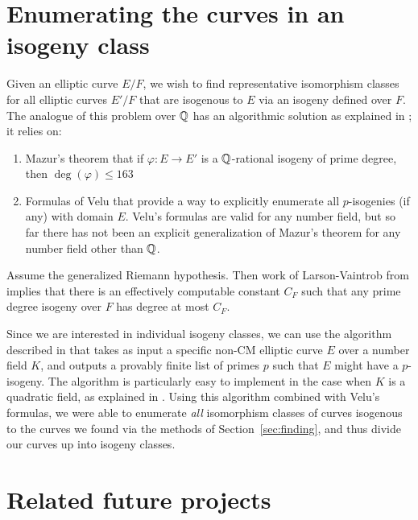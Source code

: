 \documentclass{amsart}
\begin{document}
\section{Enumerating the curves in an isogeny class}\label{sec:isoclass}

Given an elliptic curve $E/F$, we wish to find representative
isomorphism classes for all elliptic curves $E'/F$ that are isogenous
to $E$ via an isogeny defined over $F$. The analogue of this problem
over $\mathbb{Q}$ has an algorithmic solution as explained in
\cite[\S3.8]{cremona:algs}; it relies on:
\begin{enumerate}
\item  Mazur's theorem \cite{mazur:rational} 
that if $\varphi:E\to E'$ is a $\mathbb{Q}$-rational isogeny of prime degree, 
then $\deg(\varphi)\leq 163$
\item Formulas of Velu \cite{velu:isogenies} 
that provide a way to explicitly enumerate all $p$-isogenies (if any) with domain $E$.  
Velu's formulas are valid for any number field, but so far there has not been an explicit
generalization of Mazur's theorem for any number field other than $\mathbb{Q}$. 
\end{enumerate}

\begin{remark}
  Assume the generalized Riemann hypothesis.  Then work of Larson-Vaintrob 
  from \cite{larson-vaintrob} implies that there is an effectively computable constant $C_F$ 
  such that any prime degree isogeny over $F$ has degree at most $C_F$.
\end{remark}

Since we are interested in individual isogeny classes, 
we can use the algorithm described in \cite{billerey:isog} that takes as
input a specific non-CM elliptic curve $E$ over a number field $K$, and
outputs a provably finite list of primes $p$ such that $E$ might have a
$p$-isogeny. The algorithm is particularly easy to implement in the
case when $K$ is a quadratic field, as explained in
\cite[\S2.3.4]{billerey:isog}.  Using this algorithm combined with
Velu's formulas, we were able to enumerate {\em all}
isomorphism classes of curves isogenous to the curves we found via the
methods of Section~\ref{sec:finding}, and thus divide our curves up into
isogeny classes.


\section{Related future projects}\label{sec:future}
\end{document}
